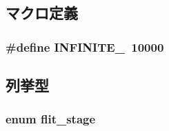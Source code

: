 \subsection{マクロ定義}
\hypertarget{NetworkHeader_8hh_aac76a431309c71d2b2fca34b5a9896ba}{
\subsubsection[{INFINITE\_\-}]{\setlength{\rightskip}{0pt plus 5cm}\#define INFINITE\_\-~10000}}
\label{NetworkHeader_8hh_aac76a431309c71d2b2fca34b5a9896ba}


\subsection{列挙型}
\hypertarget{NetworkHeader_8hh_a1af1206699d48009a5cbd0c2c1d7ce15}{
\subsubsection[{flit\_\-stage}]{\setlength{\rightskip}{0pt plus 5cm}enum {\bf flit\_\-stage}}}
\label{NetworkHeader_8hh_a1af1206699d48009a5cbd0c2c1d7ce15}
